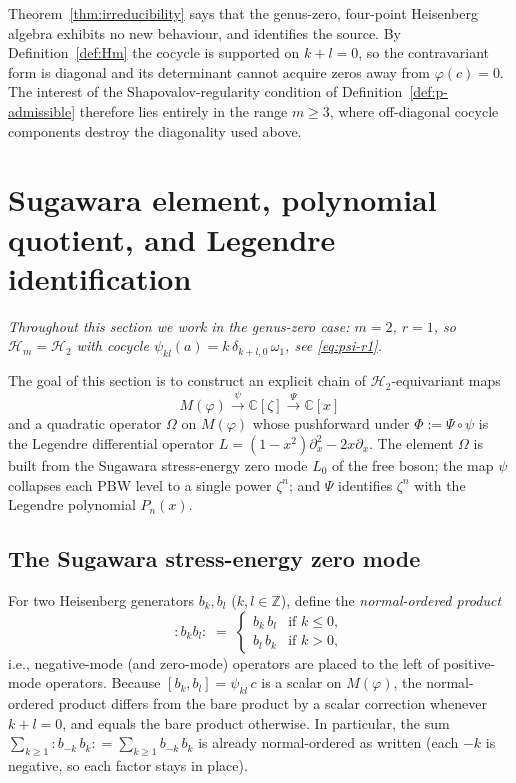 \documentclass[12pt]{amsart}
\theoremstyle{plain}
\theoremstyle{definition}
\newcommand{\CC}{\mathbb{C}}
\newcommand{\ZZ}{\mathbb{Z}}
\newcommand{\Hm}{{\mathcal{H}_m}}     %
\newcommand{\Mf}{M(\varphi)}          %
\newcommand{\Om}{\Omega}              %
\begin{document}
Theorem~\ref{thm:irreducibility} says that
the genus-zero, four-point Heisenberg algebra exhibits no new
behaviour, and identifies the source. By Definition~\ref{def:Hm} the
cocycle is supported on $k+l=0$, so the contravariant form is diagonal
and its determinant cannot acquire zeros away from $\varphi(c)=0$. The
interest of the Shapovalov-regularity condition of
Definition~\ref{def:p-admissible} therefore lies entirely in the range
$m\ge 3$, where off-diagonal cocycle components destroy the diagonality
used above. 


\section{Sugawara element, polynomial quotient, and Legendre identification}
\label{sec:casimir}

\textit{Throughout this section we work in the genus-zero case:
$m = 2$, $r = 1$, so $\Hm = \mathcal{H}_2$ with cocycle
$\psi_{kl}(a) = k\,\delta_{k+l,0}\,\omega_1$, see \eqref{eq:psi-r1}.}

The goal of this section is to construct an explicit chain of
$\mathcal{H}_2$-equivariant maps
\[
  \Mf \xrightarrow{\;\psi\;} \CC[\zeta]
       \xrightarrow{\;\Psi\;} \CC[x]
\]
and a quadratic operator $\Om$ on $\Mf$ whose pushforward under
$\Phi := \Psi\circ\psi$ is the Legendre differential operator
$L = (1-x^2)\partial_x^2 - 2x\partial_x$.
The element $\Om$ is built from the Sugawara stress-energy zero mode
$L_0$ of the free boson; the map $\psi$ collapses each PBW level to
a single power $\zeta^n$; and $\Psi$ identifies $\zeta^n$ with the Legendre
polynomial $P_n(x)$.

\subsection{The Sugawara stress-energy zero mode}
\label{subsec:sugawara}


For two Heisenberg generators $b_k,b_l$ ($k,l\in\ZZ$), define the
\emph{normal-ordered product}
\[
  {:}b_k b_l{:}
  \;=\;
  \begin{cases}
    b_k\,b_l & \text{if } k \le 0,\\[2pt]
    b_l\,b_k & \text{if } k > 0,
  \end{cases}
\]
i.e., negative-mode (and zero-mode) operators are placed to the left of
positive-mode operators.  Because $[b_k,b_l] = \psi_{kl}\,c$ is a scalar
on $\Mf$, the normal-ordered product differs from the bare product by a
scalar correction whenever $k+l=0$, and equals the bare product
otherwise.  In particular, the sum
$\sum_{k\geq 1}{:}b_{-k}\,b_k{:} = \sum_{k\geq 1} b_{-k}\,b_k$
is already normal-ordered as written (each $-k$ is negative, so each
factor stays in place).
\end{document}
